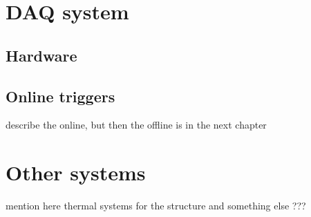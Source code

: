 \section[DAQ system]{DAQ system}

\subsection[Hardware]{Hardware}

\subsection[Online triggers]{Online triggers}

describe the online, but then the offline is in the next chapter

\section[Other systems]{Other systems}

mention here thermal systems for the structure and something else ???

